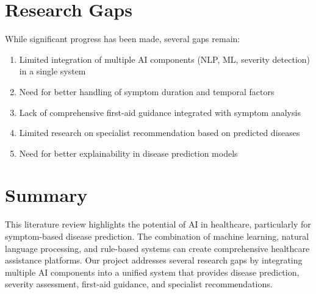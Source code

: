\section{Research Gaps}
While significant progress has been made, several gaps remain:

\begin{enumerate}
    \item Limited integration of multiple AI components (NLP, ML, severity detection) in a single system
    \item Need for better handling of symptom duration and temporal factors
    \item Lack of comprehensive first-aid guidance integrated with symptom analysis
    \item Limited research on specialist recommendation based on predicted diseases
    \item Need for better explainability in disease prediction models
\end{enumerate}

\section{Summary}
This literature review highlights the potential of AI in healthcare, particularly for symptom-based disease prediction. The combination of machine learning, natural language processing, and rule-based systems can create comprehensive healthcare assistance platforms. Our project addresses several research gaps by integrating multiple AI components into a unified system that provides disease prediction, severity assessment, first-aid guidance, and specialist recommendations.
